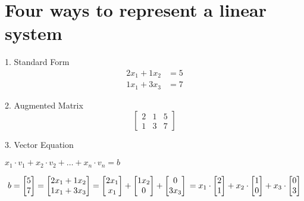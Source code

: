 \documentclass[12pt]{article}
\begin{document}


\section{Four ways to represent a linear system}

\noindent

1. Standard Form
\begin{align*}
  2x_1 + 1x_2 &= 5 \\
  1x_1 + 3x_3 &= 7 
\end{align*}

2. Augmented Matrix
$$
  \begin{bmatrix}
    2 & 1 & 5 \\
    1 & 3 & 7
  \end{bmatrix}
$$

3. Vector Equation

$x_1 \cdot v_1 + x_2 \cdot v_2 + \dots + x_n \cdot v_n = b$

\begin{equation*}
b=\begin{bmatrix} 5 \\ 7 \end{bmatrix} =
\begin{bmatrix} 2x_1 + 1x_2 \\ 1x_1 + 3x_3 \end{bmatrix} =
\begin{bmatrix} 2x_1 \\ x_1 \end{bmatrix} +
\begin{bmatrix} 1x_2 \\ 0 \end{bmatrix} +
\begin{bmatrix} 0 \\ 3x_3 \end{bmatrix} \\ = 
x_1 \cdot \begin{bmatrix} 2 \\ 1 \end{bmatrix} +
x_2 \cdot \begin{bmatrix} 1 \\ 0 \end{bmatrix} +
x_3 \cdot \begin{bmatrix} 0 \\ 3 \end{bmatrix}
\end{equation*}
\end{document}
